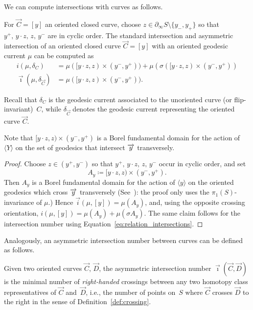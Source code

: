 We can compute intersections with curves as follows.

\begin{lemma}
\label{lem:asymmetric_intersection_current}
  For $\vec C = [y]$ an oriented closed curve, choose
$z \in \partial_{\infty} S \setminus \{ y_-, y_+\}$ so that
$y^+,\, y \cdot z,\,z,\,y^-$ are in cyclic order.
The standard intersection and asymmetric intersection
of an oriented closed curve $\vec C=[y]$ with an oriented geodesic current $\mu$ can be computed as 
\begin{align*}
i(\mu, \delta_C) &= \mu([y \cdot z,z) \times (y^-,y^+)) +
                   \mu(\sigma([y\cdot z,z) \times (y^-,y^+))\\
\vec{\imath}(\mu, \delta_{\vec C}) &= \mu([y \cdot z,z) \times (y^-,y^+)).
\end{align*}
\end{lemma}
Recall that $\delta_C$ is the geodesic current associated to the unoriented curve (or flip-invariant)~$C$, while $\delta_{\vec C}$ denotes the geodesic current representing the oriented curve $\vec C$.

Note that
$[y\cdot z,z)\times (y^-,y^+)$ is a Borel fundamental domain for the action of $\langle Y \rangle$ on the set of geodesics that intersect $\overrightarrow{y}$ transversely.
\begin{proof}
Choose $z\in(y^+,y^-)$ so that $y^+,\,y\cdot z,\,z,\,y^-$
occur in cyclic order, and set
\[
A_y\coloneqq [y\cdot z,z)\times(y^-,y^+).
\]
Then $A_y$ is a Borel fundamental domain for the action of
$\langle y\rangle$ on the oriented geodesics which cross
$\overrightarrow{y}$ transversely (See~\cite[Lemma~4.8]{HP97:RigidityNegCurvedCone}): the proof only uses
the $\pi_1(S)$-invariance of $\mu$.) Hence
$\vec i(\mu,[y])=\mu(A_y)$,
and, using the opposite crossing orientation,
$i(\mu,[y])=\mu(A_y)+\mu(\sigma A_y)$. The same claim follows for the intersection number using Equation~\ref{eq:relation_intersections}.
\end{proof} 

Analogously, an asymmetric intersection number between curves can be defined as follows.

\begin{definition}\label{def:asym-intersect}
  Given two oriented curves $\vec C$, $\vec D$, the asymmetric intersection number $\vec{\imath}(\vec C, \vec D)$ is the minimal number of \emph{right-handed} crossings between any two homotopy class representatives of $\vec C$ and~$\vec D$, i.e., the number of points on~$S$ where $\vec C$ crosses $\vec D$ to the right in the sense of Definition~\ref{def:crossing}.
\end{definition}

